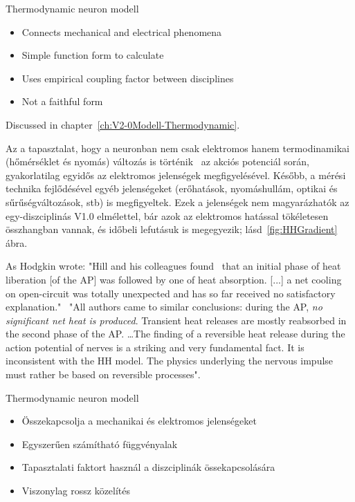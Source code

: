 \proconpanel
{Thermodynamic neuron modell}
{
\begin{itemize}[noitemsep]
	\item Connects mechanical and electrical phenomena
	\item Simple function form to calculate
\end{itemize}
}
{
\begin{itemize}[noitemsep]
	\item Uses empirical coupling factor between disciplines
	\item Not a faithful form
\end{itemize}



Discussed in chapter~\ref{ch:V2-0Modell-Thermodynamic}.

\else

Az a tapasztalat,  hogy a neuronban nem csak elektromos hanem termodinamikai (hőmérséklet és nyomás) változás is történik~\cite{HeatProductionNeuron:1958} az akciós potenciál során, gyakorlatilag egyidős az elektromos jelenségek megfigyelésével. Később, a mérési technika fejlődésével egyéb jelenségeket (erőhatások, nyomáshullám, optikai és sűrűségváltozások, stb) is megfigyeltek. Ezek a jelenségek nem magyarázhatók az egy-diszciplinás V1.0 elmélettel, bár azok az elektromos hatással tökéletesen összhangban vannak, és időbeli lefutásuk is megegyezik; lásd~\ref{fig:HHGradient} ábra.


As Hodgkin wrote: "Hill and his colleagues found~\cite{HeatProductionNeuron:1958} that an initial phase of heat liberation [of the \gls{AP}] was followed by one of
heat absorption. [...] a net cooling on open-circuit was totally unexpected
and has so far received no satisfactory explanation."~\cite{HodgkinConduction:1964}
"All authors came to similar conclusions: during
the \gls{AP}, \textit{no signiﬁcant net heat is produced}. Transient heat releases are mostly reabsorbed in the second phase of the \gls{AP}. \dots The ﬁnding of a reversible heat release during the action potential of
nerves is a striking and very fundamental fact. It is inconsistent with the
\gls{HH} model.
The physics underlying the nervous impulse
must rather be based on reversible processes".~\cite{ThermalBiophysics:2007}


\proconpanel
{Thermodynamic neuron modell}
{
\begin{itemize}[noitemsep]
	\item Összekapcsolja a mechanikai és elektromos jelenségeket
	\item Egyszerűen számítható függvényalak
\end{itemize}
}
{
\begin{itemize}[noitemsep]
	\item Tapasztalati faktort használ a diszciplinák össekapcsolására
	\item Viszonylag rossz közelítés
\end{itemize}


}}
